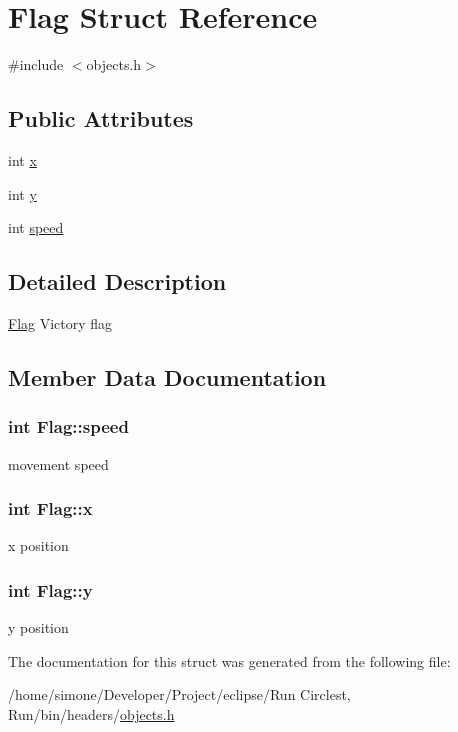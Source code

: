 \hypertarget{struct_flag}{\section{Flag Struct Reference}
\label{struct_flag}
}


{\ttfamily \#include $<$objects.\-h$>$}

\subsection*{Public Attributes}
\begin{DoxyCompactItemize}
\item 
int \hyperlink{struct_flag_ae85549a3a9ed8f0e4319bc860cee7bd6}{x}
\item 
int \hyperlink{struct_flag_a2d42deaa3c08d73af6b73dbf5de945a3}{y}
\item 
int \hyperlink{struct_flag_a52b1ad5e7c0bc3d4399fede5876b18df}{speed}
\end{DoxyCompactItemize}


\subsection{Detailed Description}
\hyperlink{struct_flag}{Flag} Victory flag 

\subsection{Member Data Documentation}
\hypertarget{struct_flag_a52b1ad5e7c0bc3d4399fede5876b18df}{
\subsubsection[{speed}]{\setlength{\rightskip}{0pt plus 5cm}int Flag\-::speed}}\label{struct_flag_a52b1ad5e7c0bc3d4399fede5876b18df}
movement speed \hypertarget{struct_flag_ae85549a3a9ed8f0e4319bc860cee7bd6}{
\subsubsection[{x}]{\setlength{\rightskip}{0pt plus 5cm}int Flag\-::x}}\label{struct_flag_ae85549a3a9ed8f0e4319bc860cee7bd6}
x position \hypertarget{struct_flag_a2d42deaa3c08d73af6b73dbf5de945a3}{
\subsubsection[{y}]{\setlength{\rightskip}{0pt plus 5cm}int Flag\-::y}}\label{struct_flag_a2d42deaa3c08d73af6b73dbf5de945a3}
y position 

The documentation for this struct was generated from the following file\-:\begin{DoxyCompactItemize}
\item 
/home/simone/\-Developer/\-Project/eclipse/\-Run Circlest, Run/bin/headers/\hyperlink{objects_8h}{objects.\-h}\end{DoxyCompactItemize}
